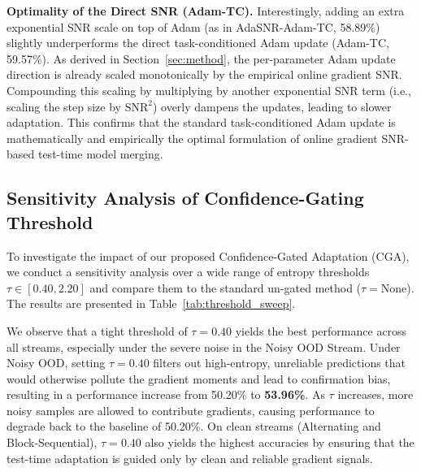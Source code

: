 \documentclass{article}
\theoremstyle{plain}
\theoremstyle{definition}
\theoremstyle{remark}
\begin{document}
\textbf{Optimality of the Direct SNR (Adam-TC).} Interestingly, adding an extra exponential SNR scale on top of Adam (as in AdaSNR-Adam-TC, 58.89\%) slightly underperforms the direct task-conditioned Adam update (Adam-TC, 59.57\%). As derived in Section~\ref{sec:method}, the per-parameter Adam update direction is already scaled monotonically by the empirical online gradient SNR. Compounding this scaling by multiplying by another exponential SNR term (i.e., scaling the step size by $\text{SNR}^2$) overly dampens the updates, leading to slower adaptation. This confirms that the standard task-conditioned Adam update is mathematically and empirically the optimal formulation of online gradient SNR-based test-time model merging.

\subsection{Sensitivity Analysis of Confidence-Gating Threshold}
To investigate the impact of our proposed Confidence-Gated Adaptation (CGA), we conduct a sensitivity analysis over a wide range of entropy thresholds $\tau \in [0.40, 2.20]$ and compare them to the standard un-gated method ($\tau = \text{None}$). The results are presented in Table~\ref{tab:threshold_sweep}.

We observe that a tight threshold of $\tau = 0.40$ yields the best performance across all streams, especially under the severe noise in the Noisy OOD Stream. Under Noisy OOD, setting $\tau = 0.40$ filters out high-entropy, unreliable predictions that would otherwise pollute the gradient moments and lead to confirmation bias, resulting in a performance increase from 50.20\% to \textbf{53.96\%}. As $\tau$ increases, more noisy samples are allowed to contribute gradients, causing performance to degrade back to the baseline of 50.20\%. On clean streams (Alternating and Block-Sequential), $\tau = 0.40$ also yields the highest accuracies by ensuring that the test-time adaptation is guided only by clean and reliable gradient signals.
\end{document}
